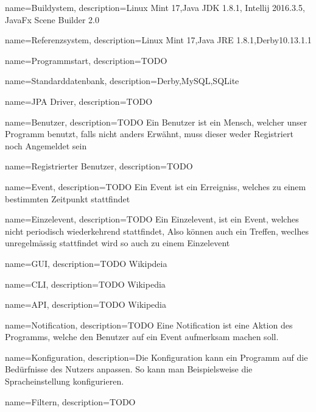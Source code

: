 
{
  name=Buildystem,
  description={Linux Mint 17,Java JDK 1.8.1, Intellij 2016.3.5, JavaFx Scene Builder 2.0}
} 

{
  name=Referenzsystem,
  description={Linux Mint 17,Java JRE 1.8.1,Derby10.13.1.1}
} 

{
  name=Programmstart,
  description={TODO}
} 


 
{
  name=Standarddatenbank,
  description={Derby,MySQL,SQLite}
} 


{
  name=JPA Driver,
  description={TODO}
} 

{
  name=Benutzer,
  description={TODO Ein Benutzer ist ein Mensch, welcher unser Programm benutzt, falls nicht anders Erwähnt, muss dieser weder Registriert noch Angemeldet sein}
} 



{
  name=Registrierter Benutzer,
  description={TODO}
} 

{
  name=Event,
  description={TODO Ein Event ist ein Erreigniss, welches zu einem bestimmten Zeitpunkt stattfindet}
} 

{
  name=Einzelevent,
  description={TODO Ein Einzelevent, ist ein Event, welches nicht periodisch wiederkehrend stattfindet, Also können auch ein Treffen, weclhes unregelmässig stattfindet wird so auch zu einem Einzelevent}
} 

{
  name=GUI,
  description={TODO Wikipdeia}
} 

{
  name=CLI,
  description={TODO Wikipedia}
} 

{
  name=API,
  description={TODO Wikipedia}
} 

{
  name=Notification,
  description={TODO Eine Notification ist eine Aktion des Programms, welche den Benutzer auf ein Event aufmerksam machen soll.}
} 

{
  name=Konfiguration,
  description={Die Konfiguration kann ein Programm auf die Bedürfnisse des Nutzers anpassen. So kann man Beispielsweise die Spracheinstellung konfigurieren.}
} 



{
  name=Filtern,
  description={TODO}
} 


